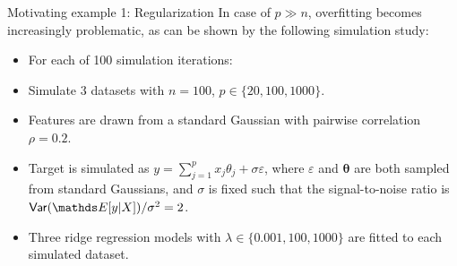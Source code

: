 \documentclass[11pt,compress,t,notes=noshow, xcolor=table]{beamer}
\begin{document}
    

\begin{vbframe}{Motivating example 1: Regularization}
  In case of $p \gg n$,  overfitting becomes increasingly problematic, as can be shown by the following simulation study:

  \begin{itemize}
    \item For each of 100 simulation iterations:
    \item Simulate 3 datasets with $n=100$, $p \in \{ 20, 100, 1000 \}$.
    \item Features are drawn from a standard Gaussian with pairwise correlation $\rho=0.2$.
      \item Target is simulated as
    $ y = \sum_{j=1}^p x_j \theta_j + \sigma\varepsilon $, where $\varepsilon$ and $\bm{\theta}$ are both sampled from standard Gaussians, and $\sigma$ is fixed such that the signal-to-noise ratio is $\var (\E[y|X]) / \sigma^2 = 2$.
    \item Three ridge regression models with $\lambda \in \{ 0.001, 100, 1000 \}$ are fitted to each simulated dataset.
  \end{itemize}

  \framebreak


\end{vbframe}
\end{document}

